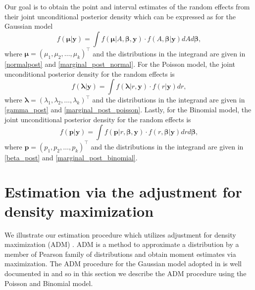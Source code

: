 \documentclass[article]{jss}
\begin{document}
Our goal is to obtain the point and interval estimates of the random effects from their joint unconditional posterior density which can be expressed as for the Gaussian  model
\begin{equation}\label{mcintegration_normal}
f(\boldsymbol{\mu}\vert \boldsymbol{y})=\int  f(\boldsymbol{\mu}\vert A, \boldsymbol{\beta}, \boldsymbol{y})\cdot f(A, \boldsymbol{\beta}\vert \boldsymbol{y})dA d\boldsymbol{\beta},
\end{equation}
where $\boldsymbol{\mu}=(\mu_1, \mu_2, \ldots, \mu_k)^\top$ and the distributions in the integrand  are given in \eqref{normalpost} and \eqref{marginal_post_normal}.  For the Poisson  model, the joint unconditional posterior density for the random effects is
\begin{equation}\label{mcintegration_poisson}
f(\boldsymbol{\lambda}\vert \boldsymbol{y})=\int  f(\boldsymbol{\lambda}\vert r, \boldsymbol{y})\cdot f(r\vert \boldsymbol{y})dr,
\end{equation}
where  $\boldsymbol{\lambda}=(\lambda_1, \lambda_2, \ldots, \lambda_k)^\top$ and  the distributions in the integrand  are given in \eqref{gamma_post} and \eqref{marginal_post_poisson}. Lastly, for the Binomial  model, the joint unconditional posterior density for the random effects is
\begin{equation}\label{mcintegration_binomial}
f(\boldsymbol{p}\vert \boldsymbol{y})=\int  f(\boldsymbol{p}\vert r, \boldsymbol{\beta}, \boldsymbol{y})\cdot f(r, \boldsymbol{\beta}\vert \boldsymbol{y})dr d\boldsymbol{\beta},
\end{equation}
where $\boldsymbol{p}=(p_1, p_2, \ldots, p_k)^\top$ and  the distributions in the integrand  are given in \eqref{beta_post} and \eqref{marginal_post_binomial}. 



\section[Estimation]{Estimation via the adjustment for density maximization}\label{sec3}



We illustrate our estimation procedure which utilizes adjustment for density maximization (ADM) \citep{carl1988, morris1997, tang2011}. ADM is a method  to  approximate a distribution by a member of Pearson family of distributions and obtain moment estimates via maximization. The ADM procedure for the Gaussian model adopted in  is well documented in \cite{kelly2014advances} and so in this section we  describe  the ADM procedure  using the Poisson and Binomial model. 
\end{document}
